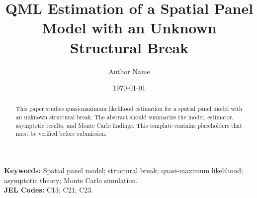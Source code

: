 \documentclass[12pt]{article}
\title{QML Estimation of a Spatial Panel Model with an Unknown Structural Break}
\author{Author Name}
\date{\today}
\begin{document}
\maketitle

\begin{abstract}
This paper studies quasi-maximum likelihood estimation for a spatial panel model with an unknown structural break. The abstract should summarize the model, estimator, asymptotic results, and Monte Carlo findings. This template contains placeholders that must be verified before submission.
\end{abstract}

\noindent\textbf{Keywords:} Spatial panel model; structural break; quasi-maximum likelihood; asymptotic theory; Monte Carlo simulation.\\
\textbf{JEL Codes:} C13; C21; C23.











\appendix





\end{document}
